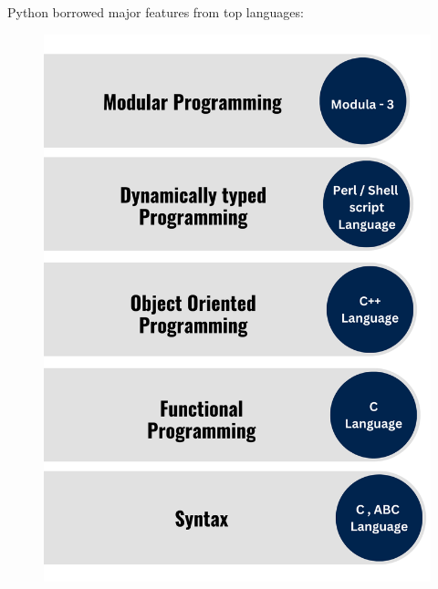 

\begin{flushleft}	
	\bigskip

		Python borrowed major features from top languages:

		\begin{figure}[h!]

			\centering

			\includegraphics[scale=0.6]{content/chapter0/images/lang.png}

		\end{figure}
	
\end{flushleft}


\newpage



